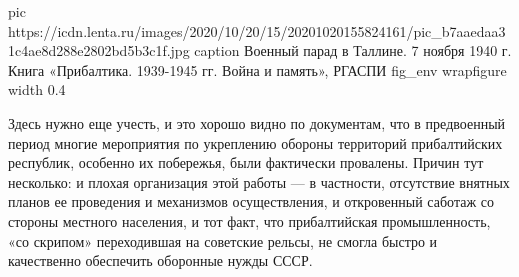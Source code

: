 \ifcmt
pic https://icdn.lenta.ru/images/2020/10/20/15/20201020155824161/pic_b7aaedaa31c4ae8d288e2802bd5b3c1f.jpg
caption Военный парад в Таллине. 7 ноября 1940 г.  Книга «Прибалтика. 1939-1945 гг. Война и память», РГАСПИ
fig_env wrapfigure
width 0.4
\fi

Здесь нужно еще учесть, и это хорошо видно по документам, что в предвоенный
период многие мероприятия по укреплению обороны территорий прибалтийских
республик, особенно их побережья, были фактически провалены. Причин тут
несколько: и плохая организация этой работы — в частности, отсутствие внятных
планов ее проведения и механизмов осуществления, и откровенный саботаж со
стороны местного населения, и тот факт, что прибалтийская промышленность, «со
скрипом» переходившая на советские рельсы, не смогла быстро и качественно
обеспечить оборонные нужды СССР.

